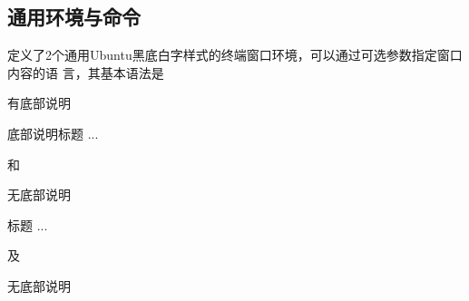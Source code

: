 \documentclass{ctexart}
\begin{document}

\subsection{通用环境与命令}
定义了2个通用Ubuntu黑底白字样式的终端窗口环境，可以通过可选参数指定窗口内容的语
言，其基本语法是
\begin{langPyOne}[tex]{有底部说明}
  \begin{GitExample}[代码语言]{底部说明}{标题}
     ...
  \end{GitExample} 
\end{langPyOne}
和
\begin{langPyOne}[tex]{无底部说明}
  \begin{GitExampla}[代码语言]{标题}
     ...
  \end{GitExampla} 
\end{langPyOne}
及
\begin{langPyOne}[tex]{无底部说明}
\end{langPyOne}  
\end{document}
